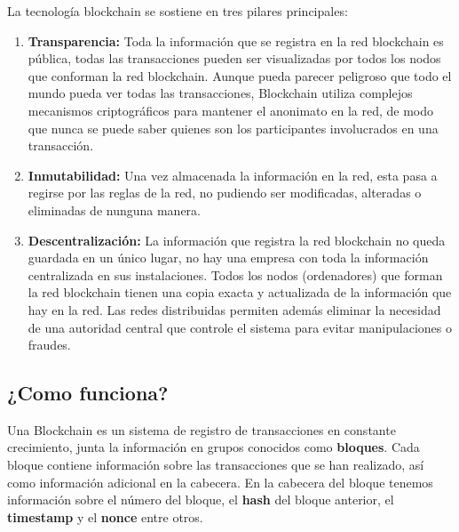 La tecnología blockchain se sostiene en tres pilares principales:
\begin{enumerate}
  \item \textbf{Transparencia:} Toda la información que se registra en la red blockchain es pública, todas las transacciones pueden ser visualizadas por todos los nodos que conforman la red blockchain. Aunque pueda parecer peligroso que todo el mundo pueda ver todas las transacciones, Blockchain utiliza complejos mecanismos criptográficos para mantener el anonimato en la red, de modo que nunca se puede saber quienes son los participantes involucrados en una transacción. 
  \item \textbf{Inmutabilidad:} Una vez almacenada la información en la red, esta pasa a regirse por las reglas de la red, no pudiendo ser modificadas, alteradas o eliminadas de nunguna manera. 
  \item \textbf{Descentralización:} La información que registra la red blockchain no queda guardada en un único lugar, no hay una empresa con toda la información centralizada en sus instalaciones. Todos los nodos (ordenadores) que forman la red blockchain tienen una copia exacta y actualizada de la información que hay en la red. Las redes distribuidas permiten además eliminar la necesidad de una autoridad central que controle el sistema para evitar manipulaciones o fraudes. 
\end{enumerate}

\subsection{¿Como funciona?}

Una Blockchain es un sistema de registro de transacciones en constante crecimiento, junta la información en grupos conocidos como \textbf{bloques}. Cada bloque contiene información sobre las transacciones que se han realizado, así como información adicional en la cabecera. En la cabecera del bloque tenemos información sobre el número del bloque, el \textbf{hash} del bloque anterior, el \textbf{timestamp} y el \textbf{nonce} entre otros. \\

